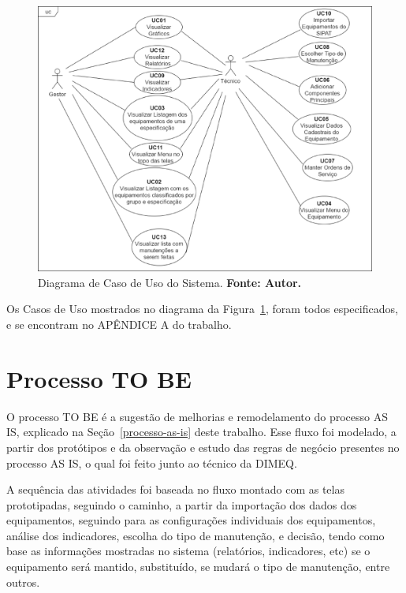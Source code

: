 \graphicspath{{figuras/}}
\begin{figure}[H]
\centering
\includegraphics[width=1.0\textwidth]{diagrama-de-caso-de-uso}
\caption{Diagrama de Caso de Uso do Sistema. \textbf{Fonte: Autor.}}
\label{diagrama-de-caso-de-uso}
\end{figure}

Os Casos de Uso mostrados no diagrama da Figura~\ref{diagrama-de-caso-de-uso}, foram todos especificados, e se encontram no APÊNDICE A do trabalho.


\pagebreak

\section{Processo TO BE}
\label{to-be}

O processo TO BE é a sugestão de melhorias e remodelamento do processo AS IS, explicado na Seção~\ref{processo-as-is} deste trabalho. Esse fluxo foi modelado, a partir dos protótipos e da observação e estudo das regras de negócio presentes no processo AS IS, o qual foi feito junto ao técnico da DIMEQ. 

A sequência das atividades foi baseada no fluxo montado com as telas prototipadas, seguindo o caminho, a partir da importação dos dados dos equipamentos, seguindo para as configurações individuais dos equipamentos, análise dos indicadores, escolha do tipo de manutenção, e decisão, tendo como base as informações mostradas no sistema (relatórios, indicadores, etc) se o equipamento será mantido, substituído, se mudará o tipo de manutenção, entre outros.


